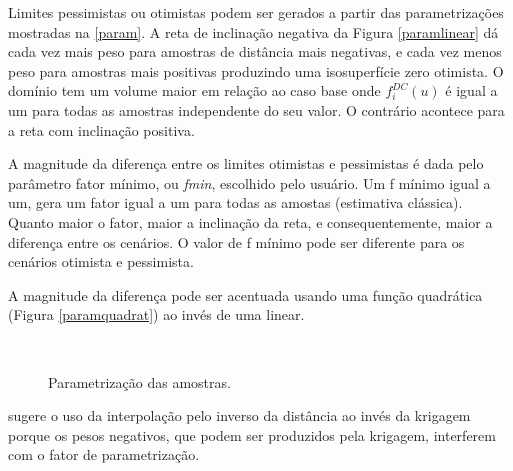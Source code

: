 Limites pessimistas ou otimistas podem ser gerados a partir das parametrizações mostradas na \autoref{param}. A reta de inclinação negativa da Figura \autoref{paramlinear} dá cada vez mais peso para amostras de distância mais negativas, e cada vez menos peso para amostras mais positivas produzindo uma isosuperfície zero otimista. O domínio tem um volume maior em relação ao caso base onde $f^{DC}_i(u)$ é igual a um para todas as amostras independente do seu valor. O contrário acontece para a reta com inclinação positiva. 

A magnitude da diferença entre os limites otimistas e pessimistas é dada pelo parâmetro fator mínimo, ou \textit{fmin}, escolhido pelo usuário. Um f mínimo igual a um, gera um fator igual a um para todas as amostas (estimativa clássica). Quanto maior o fator, maior a inclinação da reta, e consequentemente, maior a diferença entre os cenários. O valor de f mínimo pode ser diferente para os cenários otimista e pessimista.

A magnitude da diferença pode ser acentuada usando uma função quadrática (Figura \autoref{paramquadrat}) ao invés de uma linear.

\begin{figure}[H] 
    \centering
    \caption{Parametrização das amostras.} \label{param}
      \\
\end{figure}

 sugere o uso da interpolação pelo inverso da distância ao invés da krigagem porque os pesos negativos, que podem ser produzidos pela krigagem, interferem com o fator de parametrização.

